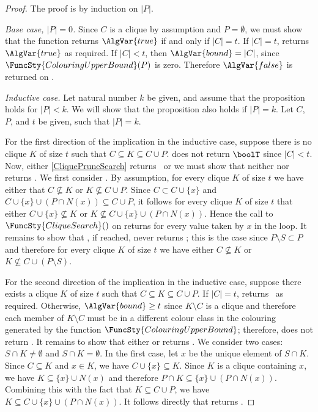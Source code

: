 \begin{proof}
  The proof is by induction on $|P|$.
  
  \emph{Base case, $|P|=0$.} Since $C$ is a clique by assumption and $P = \emptyset$,
    we must show that the function returns $\AlgVar{true}$ if and only if $|C| = t$.
    If $|C| = t$,  returns $\AlgVar{true}$ as required.
    If $|C| < t$, then $\AlgVar{bound} = |C|$, since $\FuncSty{ColouringUpperBound}(P)$
    is zero. Therefore $\AlgVar{false}$ is returned on .

  \emph{Inductive case.} Let natural number $k$ be given, and assume that the proposition holds
    for $|P| < k$. We will show that the proposition also holds if $|P| = k$.  Let $C$, $P$,
    and $t$ be given, such that $|P| = k$.

  For the first direction of the implication in the inductive case, suppose there is no clique
  $K$ of size $t$ such that $C \subseteq K \subseteq C \cup P$.  
  does not return $\boolT$ since $|C| < t$. Now, either \cref{CliquePruneSearch} returns \boolF\
  or we must show that neither  nor 
  returns \boolT. We first consider \lineref{CliqueFirstSearch}. By assumption, for every clique $K$
  of size $t$ we have either that $C \not\subseteq K$ or $K \not\subseteq C \cup P$.  Since
  $C \subset C \cup \{x\}$ and $C \cup \{x\} \cup (P \cap N(x)) \subseteq C \cup P$, it follows
  for every clique $K$ of size $t$ that either
  $C \cup \{x\} \not\subseteq K$ or $K \not\subseteq C \cup \{x\} \cup (P \cap N(x))$.  Hence
  the call to $\FuncSty{CliqueSearch}()$ on \lineref{CliqueFirstSearch} returns \boolF
  for every value taken by $x$ in the loop.  It remains to show
  that , if reached, never returns \boolT; this is the case since
  $P \setminus S \subset P$ and therefore for every clique $K$ of size $t$ we have either
  $C \not\subseteq K$ or $K \not\subseteq C \cup (P \setminus S)$.

  For the second direction of the implication in the inductive case, suppose there exists a clique
  $K$ of size $t$ such that $C \subseteq K \subseteq C \cup P$.  If $|C|=t$, 
  returns \boolT\ as required.  Otherwise, $\AlgVar{bound} \geq t$ since $K \setminus C$ is a clique
  and therefore each member of $K \setminus C$ must be in a different colour class in the colouring
    generated by the function $\FuncSty{ColouringUpperBound}$; therefore, 
    does not return \boolF.  It remains to show that either 
   or  returns \boolT. We consider two
  cases: $S \cap K \not= \emptyset$ and $S \cap K = \emptyset$.  In the first case, let $x$ be
  the unique element of $S \cap K$.  Since $C \subseteq K$ and $x \in K$, we have
  $C \cup \{x\} \subseteq K$.
  Since $K$ is a clique containing $x$, we have $K \subseteq \{x\} \cup N(x)$ and
    therefore $P \cap K \subseteq \{x\} \cup (P \cap N(x))$.
  Combining this with the fact that $K \subseteq C \cup P$,
  we have $K \subseteq C \cup \{x\} \cup (P \cap N(x))$.  It follows directly that 
  returns \boolT.


\end{proof}
